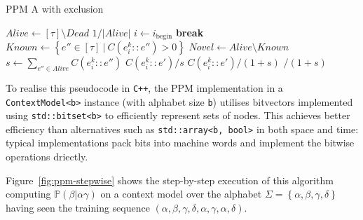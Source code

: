 \documentclass[12pt,a4paper,twoside,openright]{report}
\newcommand{\set}[1]{ \left\{ #1 \right\} }
\begin{document}
\begin{algorithm}[H]
  \caption{PPM A with exclusion}
  \label{alg:ppm-a}
  \begin{algorithmic}[1]
      \State $\textit{Alive} \gets [\tau] \setminus \textit{Dead}$
      \State \Return $1 / |\textit{Alive}|$ 
      \EndIf
      \State $i \gets i_{\mathrm{begin}}$
       \textbf{break}
        \EndIf       
      \EndFor 
      \State $\textit{Known} \gets \set{ e'' \in [\tau]\ |\ C(e_i^k :: e'') > 0 }$
      \State $\textit{Novel} \gets Alive \setminus Known$ 
      \State $s \gets \sum_{e'' \in \textit{Alive}} C(e_i^k :: e'')$ 
        \State \Return $C(e_i^k :: e') / s$ 
      \EndIf
      \State \Return $C(e_i^k::e') / (1 + s)$ 
      \EndIf
      \State \Return {}$ / (1
      + s)$ 
    \EndFunction
  \end{algorithmic}
\end{algorithm}

To realise this pseudocode in \texttt{C++}, the PPM implementation in a
\texttt{ContextModel<b>} instance (with alphabet size \texttt{b}) utilises
bitvectors implemented using \texttt{std::bitset<b>} to efficiently represent
sets of nodes. This achieves better efficiency than alternatives such as
\texttt{std::array<b, bool>} in both space and time: typical implementations
pack bits into machine words and implement the bitwise operations driectly.

Figure~\ref{fig:ppm-stepwise} shows the step-by-step execution of this algorithm
computing $\mathbb{P}(\beta|\alpha\gamma)$ on a context model over the alphabet $\Sigma =
\set{\alpha,\beta,\gamma,\delta}$ having seen the training sequence
$(\alpha,\beta,\gamma,\delta,\alpha,\gamma,\alpha,\delta)$.
\end{document}
